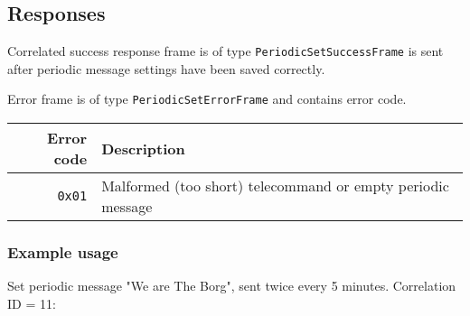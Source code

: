 \subsection{Responses}
Correlated success response frame is of type \texttt{PeriodicSetSuccessFrame} is sent after periodic message settings have been saved correctly.

Error frame is of type \texttt{PeriodicSetErrorFrame} and contains error code. 

\begin{tabular}{r | l}
	Error code & Description \\ \hline
	\texttt{0x01} & Malformed (too short) telecommand or empty periodic message
\end{tabular}

\subsubsection{Example usage}
Set periodic message "We are The Borg", sent twice every 5 minutes. Correlation ID = 11:
